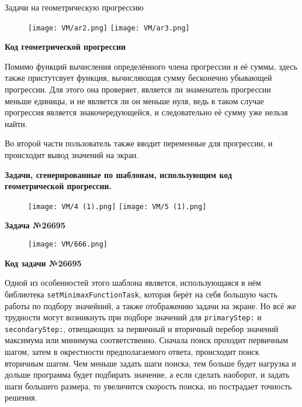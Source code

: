 Задачи на геометрическую прогрессию

\begin{figure}[h]
	\centering
	\texttt{[image: VM/ar2.png]}
	\texttt{[image: VM/ar3.png]}
	\end{figure}

\textbf{Код геометрической прогрессии}



Помимо функций вычисления определённого члена прогрессии и её суммы, здесь также пристутсвует функция, вычисляющая сумму бесконечно убывающей прогрессии. Для этого она проверяет, является ли знаменатель прогрессии меньше единицы, и не является ли он меньше нуля, ведь в таком случае прогрессия является знакочередующейся, и следовательно её сумму уже нельзя найти.

 Во второй части пользователь также вводит переменные для прогрессии, и происходит вывод значений на экран.

\textbf{Задачи, сгенерированные по шаблонам, использующим код 
\\геометрической прогрессии.}

	\begin{figure}[h]
		\centering
		\texttt{[image: VM/4 (1).png]}
		\texttt{[image: VM/5 (1).png]}
	\end{figure}
	
\textbf{Задача №26695}

	\begin{figure}[h]
		\centering
		\texttt{[image: VM/666.png]}
	\end{figure}

\textbf{Код задачи №26695}



Одной из особенностей этого шаблона является, использующаяся в нём библиотека \texttt{setMinimaxFunctionTask}, которая берёт на себя большую часть работы по подбору значейний, а также отображению задачи на экране. Но всё же трудности могут возникнуть при подборе значений для  \texttt{primaryStep:} и \texttt{secondaryStep:}, отвещающих за первичный и вторичный перебор значений максимума или минимума соответственно. Сначала поиск проходит первичным шагом, затем в окрестности предполагаемого ответа, происходит поиск вторичным шагом. Чем меньше задать шаги поиска, тем больше будет нагрузка и дольше программа будет подбирать значение, а если сделать наоборот, и задать шаги большего размера, то увеличится скорость поиска, но пострадает точность решения.


